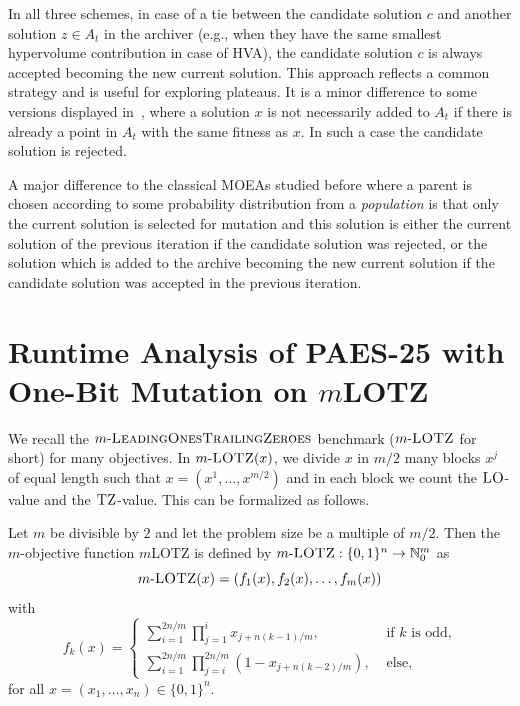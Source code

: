 \documentclass[
sigconf = false, %
review = false, %
screen = true, %
anonymous = true, %
format=acmsmall
]{acmart}
\newcommand{\mLOTZ}{\ensuremath{m}\text{-}\textsc{LOTZ}\xspace}
\newcommand{\LO}{\textsc{LO}\xspace}                      %
\newcommand{\TZ}{\textsc{TZ}\xspace}
\newcommand{\mLOTZFULL}{\ensuremath{m}\text{-}\textsc{LeadingOnesTrailingZeroes}\xspace}
\newcommand{\PAES}{PAES-25\xspace}
\newcommand{\nbc}[3]{
		{\colorbox{#3}{\bfseries\sffamily\scriptsize\textcolor{white}{#1}}}
		{\textcolor{#3}{\sf\small$\blacktriangleright$\textit{#2}$\blacktriangleleft$}}
}
\newcommand{\andre}[1]{\nbc{Andre}{#1}{red}}
\begin{document}
In all three schemes, in case of a tie between the candidate solution $c$ and another solution $z \in A_t$ in the archiver (e.g., when they have the same smallest hypervolume contribution in case of HVA), the candidate solution $c$ is always accepted becoming the new current solution. This approach reflects a common strategy and is useful for exploring plateaus. It is a minor difference to some versions displayed in~\cite{10.1109/TEVC.2003.810755}, where a solution $x$ is not necessarily added to $A_t$ if there is already a point in $A_t$ with the same fitness as $x$. In such a case the candidate solution is rejected.

A major difference to the classical MOEAs studied before where a parent is chosen according to some probability distribution from a \emph{population} is that only the current solution is selected for mutation and this solution is either the current solution of the previous iteration if the candidate solution was rejected, or the solution which is added to the archive becoming the new current solution if the candidate solution was accepted in the previous iteration. 

\section{Runtime Analysis of \PAES with One-Bit Mutation on \mLOTZ}

We recall the $\mLOTZFULL$ benchmark ($\mLOTZ$ for short) for many objectives. In $\mLOTZ(x)$, we divide $x$ in $m/2$ many blocks $x^j$ of equal length such that $x=(x^1, \ldots , x^{m/2})$ and in each block we count the $\LO$-value and the $\TZ$-value. This can be formalized as follows.
\begin{definition}
\label{def:mLOTZ}
Let $m$ be divisible by $2$ and let the problem size be a multiple of $m/2$. Then the $m$-objective function \mLOTZ is defined by
$\mLOTZ: \{0,1\}^n \to \mathbb{N}_0^m$ as 
\[
\mLOTZ(x) = (f_1(x), f_2(x), \ldots ,f_m(x))
\]
with 
\[
f_k(x)=
\begin{cases}
    \sum_{i=1}^{2n/m} \prod_{j=1}^i x_{j+n(k-1)/m}, & \text{ if $k$ is odd,} \\
    \sum_{i=1}^{2n/m} \prod_{j=i}^{2n/m} (1-x_{j+n(k-2)/m}), & \text{ else,}
\end{cases}
\]
for all $x=(x_1, \ldots ,x_n) \in \{0,1\}^n$.
\end{definition}
\end{document}
